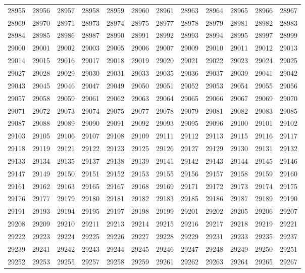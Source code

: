 \begin{center}
\begin{longtable}{llllllllllll}
28955 &28956 &28957 &28958 &28959 &28960 &28961 &28963 &28964 &28965 &28966 &28967 \\
28969 &28970 &28971 &28973 &28974 &28975 &28977 &28978 &28979 &28981 &28982 &28983 \\
28984 &28985 &28986 &28987 &28990 &28991 &28992 &28993 &28994 &28995 &28997 &28999 \\
29000 &29001 &29002 &29003 &29005 &29006 &29007 &29009 &29010 &29011 &29012 &29013 \\
29014 &29015 &29016 &29017 &29018 &29019 &29020 &29021 &29022 &29023 &29024 &29025 \\
29027 &29028 &29029 &29030 &29031 &29033 &29035 &29036 &29037 &29039 &29041 &29042 \\
29043 &29045 &29046 &29047 &29049 &29050 &29051 &29052 &29053 &29054 &29055 &29056 \\
29057 &29058 &29059 &29061 &29062 &29063 &29064 &29065 &29066 &29067 &29069 &29070 \\
29071 &29072 &29073 &29074 &29075 &29077 &29078 &29079 &29081 &29082 &29083 &29085 \\
29087 &29088 &29089 &29090 &29091 &29092 &29093 &29095 &29096 &29100 &29101 &29102 \\
29103 &29105 &29106 &29107 &29108 &29109 &29111 &29112 &29113 &29115 &29116 &29117 \\
29118 &29119 &29121 &29122 &29123 &29125 &29126 &29127 &29129 &29130 &29131 &29132 \\
29133 &29134 &29135 &29137 &29138 &29139 &29141 &29142 &29143 &29144 &29145 &29146 \\
29147 &29149 &29150 &29151 &29152 &29153 &29155 &29156 &29157 &29158 &29159 &29160 \\
29161 &29162 &29163 &29165 &29167 &29168 &29169 &29171 &29172 &29173 &29174 &29175 \\
29176 &29177 &29179 &29180 &29181 &29182 &29183 &29185 &29186 &29187 &29189 &29190 \\
29191 &29193 &29194 &29195 &29197 &29198 &29199 &29201 &29202 &29205 &29206 &29207 \\
29208 &29209 &29210 &29211 &29213 &29214 &29215 &29216 &29217 &29218 &29219 &29221 \\
29222 &29223 &29224 &29225 &29226 &29227 &29228 &29229 &29231 &29233 &29235 &29237 \\
29239 &29241 &29242 &29243 &29244 &29245 &29246 &29247 &29248 &29249 &29250 &29251 \\
29252 &29253 &29255 &29257 &29258 &29259 &29261 &29262 &29263 &29264 &29265 &29267 \\

\end{longtable}
\end{center}
